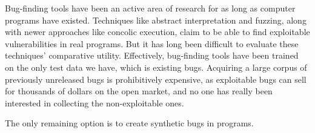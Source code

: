 

Bug-finding tools have been an active area of research for as long as computer programs have existed. Techniques like abstract interpretation and fuzzing, along with newer approaches like concolic execution, claim to be able to find exploitable vulnerabilities in real programs.  But it has long been difficult to evaluate these techniques' comparative utility. Effectively, bug-finding tools have been trained on the only test data we have, which is existing bugs. Acquiring a large corpus of previously unreleased bugs is prohibitively expensive, as exploitable bugs can sell for thousands of dollars on the open market, and no one has really been interested in collecting the non-exploitable ones.

The only remaining option is to create synthetic bugs in programs.